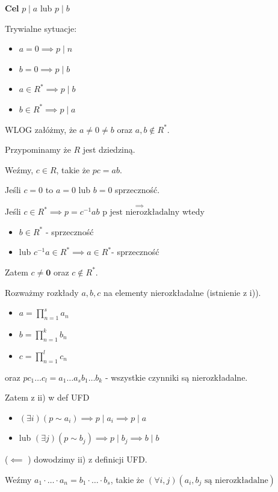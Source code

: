 \textbf{Cel} $p\mid a$ lub $p\mid b$ 

Trywialne sytuacje:
\begin{itemize}
	\item $a=0 \implies p\mid n$
	\item $b=0 \implies p\mid b$
	\item $a\in R^{\ast} \implies p\mid b$
	\item $b\in R^{\ast} \implies p\mid a$
\end{itemize}
WLOG załóżmy, że $a\neq 0 \neq b$ oraz $a,b \not\in R^{\ast} $.

Przypominamy że $R$ jest dziedziną.

Weźmy, $c\in R$, takie że $pc = ab$.

Jeśli $c=0$ to $a=0$ lub $b=0$ sprzeczność.

Jeśli $ c\in R^{\ast} \implies p = c^{-1}ab \overset{\implies}{\text{ p jest nierozkładalny} }$ wtedy
\begin{itemize}
	\item $b \in R^{\ast} $ - sprzeczność
	\item lub $c^{-1}a\in R^{\ast} \implies a \in R^{\ast} $- sprzeczność
\end{itemize}

Zatem $c\neq \mathbf{0}$ oraz $c \not\in R^{\ast} $.

Rozważmy rozkłady $a,b,c$ na elementy nierozkładalne (istnienie z i)).
\begin{itemize}
	\item $a=\prod_{n=1}^{s} a_{n} $
	\item $b=\prod_{n=1}^{k} b_{n}  $ 
	\item $c = \prod_{n=1}^{l} c_{n}  $
\end{itemize}
oraz
$pc_1\ldots c_{l} = a_1\ldots a_{s}b_1\ldots b_{k}$ - wszystkie czynniki są nierozkładalne.

Zatem z ii) w def UFD
 \begin{itemize}
	\item $\left(\exists i \right)\left( p\sim a_{i}  \right) \implies p\mid a_{i} \implies p\mid a $
	\item lub $\left(\exists j \right)\left( p\sim b_{j}  \right) \implies p\mid b_{j}\implies b\mid b $
\end{itemize}

\noindent ($\impliedby$ ) dowodzimy ii) z definicji UFD.

Weźmy $a_1\cdot \ldots\cdot a_{n} = b_1\cdot \ldots\cdot b_{s}$, takie że $\left(\forall i,j \right)\left( a_{i},b_{j} \text{ są nierozkładalne} \right)  $ 

